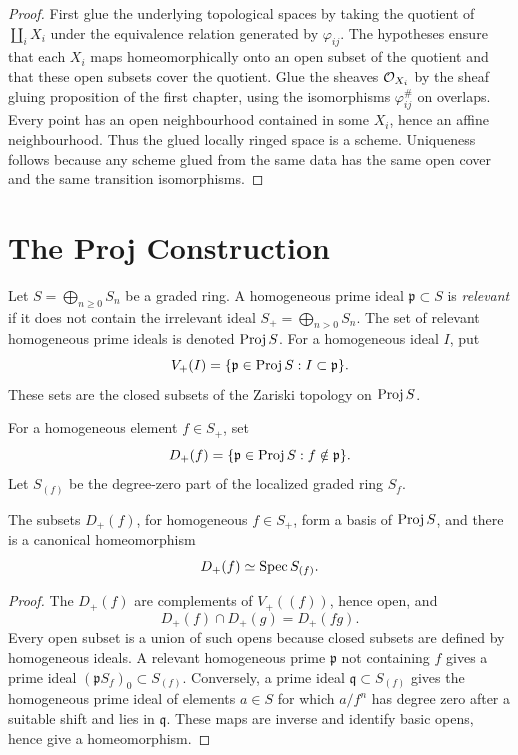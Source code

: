 \begin{proof}
First glue the underlying topological spaces by taking the quotient of
\(\coprod_i X_i\) under the equivalence relation generated by
\(\varphi_{ij}\).  The hypotheses ensure that each \(X_i\) maps homeomorphically
onto an open subset of the quotient and that these open subsets cover the
quotient.  Glue the sheaves \(\mathcal{O}_{X_i}\) by the sheaf gluing proposition of
the first chapter, using the isomorphisms \(\varphi_{ij}^\#\) on overlaps.
Every point has an open neighbourhood contained in some \(X_i\), hence an
affine neighbourhood.  Thus the glued locally ringed space is a scheme.
Uniqueness follows because any scheme glued from the same data has the same
open cover and the same transition isomorphisms.
\end{proof}

\section{The Proj Construction}

\begin{definition}
Let \(S=\bigoplus_{n\ge0}S_n\) be a graded ring.  A homogeneous prime ideal
\(\mathfrak p\subset S\) is \emph{relevant} if it does not contain the
irrelevant ideal \(S_+=\bigoplus_{n>0}S_n\).  The set of relevant homogeneous
prime ideals is denoted \(\operatorname{Proj} S\).  For a homogeneous ideal \(I\), put
\[
    V_+(I)=\{\mathfrak p\in\operatorname{Proj} S:I\subset\mathfrak p\}.
\]
These sets are the closed subsets of the Zariski topology on \(\operatorname{Proj} S\).
\end{definition}

\begin{definition}
For a homogeneous element \(f\in S_+\), set
\[
    D_+(f)=\{\mathfrak p\in\operatorname{Proj} S:f\notin\mathfrak p\}.
\]
Let \(S_{(f)}\) be the degree-zero part of the localized graded ring \(S_f\).
\end{definition}

\begin{proposition}
The subsets \(D_+(f)\), for homogeneous \(f\in S_+\), form a basis of
\(\operatorname{Proj} S\), and there is a canonical homeomorphism
\[
    D_+(f)\simeq \operatorname{Spec} S_{(f)}.
\]
\end{proposition}

\begin{proof}
The \(D_+(f)\) are complements of \(V_+((f))\), hence open, and
\[
    D_+(f)\cap D_+(g)=D_+(fg).
\]
Every open subset is a union of such opens because closed subsets are defined
by homogeneous ideals.  A relevant homogeneous prime \(\mathfrak p\) not
containing \(f\) gives a prime ideal \((\mathfrak pS_f)_0\subset S_{(f)}\).
Conversely, a prime ideal \(\mathfrak q\subset S_{(f)}\) gives the homogeneous
prime ideal of elements \(a\in S\) for which \(a/f^n\) has degree zero after a
suitable shift and lies in \(\mathfrak q\).  These maps are inverse and identify
basic opens, hence give a homeomorphism.
\end{proof}

